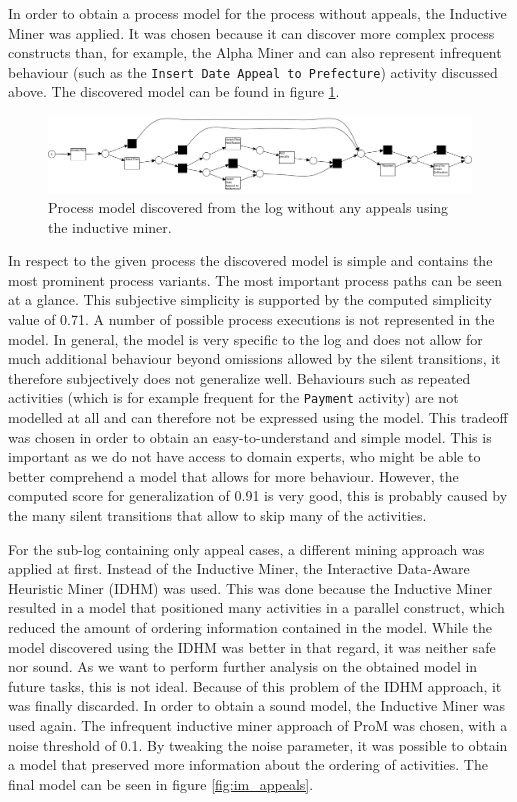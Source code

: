\documentclass[12pt]{report}
\begin{document}
In order to obtain a process model for the process without appeals, the Inductive Miner was applied. It was chosen because it can discover more complex process constructs than, for example, the Alpha Miner and can also represent infrequent behaviour (such as the \texttt{Insert Date Appeal to Prefecture}) activity discussed above. The discovered model can be found in figure \ref{fig:im_no_appeals}.
\begin{figure}[H]
  \centering
  \includegraphics[width=\textwidth]{figures/im_no_appeals.png}
  \caption{Process model discovered from the log without any appeals using the inductive miner.}
  \label{fig:im_no_appeals}
\end{figure}
In respect to the given process the discovered model is simple and contains the most prominent process variants. The most important process paths can be seen at a glance. This subjective simplicity is supported by the computed simplicity value of 0.71. A number of possible process executions is not represented in the model. In general, the model is very specific to the log and does not allow for much additional behaviour beyond omissions allowed by the silent transitions, it therefore subjectively does not generalize well. Behaviours such as repeated activities (which is for example frequent for the \texttt{Payment} activity) are not modelled at all and can therefore not be expressed using the model. This tradeoff was chosen in order to obtain an easy-to-understand and simple model. This is important as we do not have access to domain experts, who might be able to better comprehend a model that allows for more behaviour.  However, the computed score for generalization of 0.91 is very good, this is probably caused by the many silent transitions that allow to skip many of the activities. 

For the sub-log containing only appeal cases, a different mining approach was applied at first. Instead of the Inductive Miner, the Interactive Data-Aware Heuristic Miner (IDHM) was used. This was done because the Inductive Miner resulted in a model that positioned many activities in a parallel construct, which reduced the amount of ordering information contained in the model. While the model discovered using the IDHM was better in that regard, it was neither safe nor sound. As we want to perform further analysis on the obtained model in future tasks, this is not ideal. Because of this problem of the IDHM approach, it was finally discarded. In order to obtain a sound model, the Inductive Miner was used again. The infrequent inductive miner approach of ProM was chosen, with a noise threshold of 0.1. By tweaking the noise parameter, it was possible to obtain a model that preserved more information about the ordering of activities. The final model can be seen in figure \ref{fig:im_appeals}.
\end{document}
